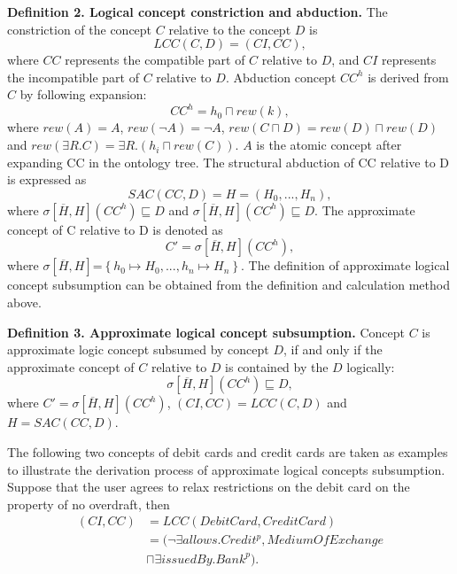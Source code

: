 \documentclass{ieeeaccess}
\begin{document}
\textbf{Definition 2. Logical concept constriction and abduction.}
The constriction of the concept $C$ relative to the concept $D$ is
\begin{equation}
LCC\left( C,D \right)=\left( CI,CC \right),
\end{equation}
where $CC$ represents the compatible part of $C$ relative to $D$, and $CI$ represents the incompatible part of $C$ relative to $D$.
Abduction concept $CC^{h}$ is derived from $C$ by following expansion:
\begin{equation}
CC^{h}={{h}_{0}}\sqcap rew\left( k \right),
\end{equation}
where $rew\left( A \right)=A$,
$rew\left( \neg A \right)=\neg A$,
$rew\left( C\sqcap D \right)=rew\left( D \right)\sqcap rew\left( D \right)$ and
$rew\left( \exists R.C \right)=\exists R.\left( {{h}_{i}}\sqcap rew\left( C \right) \right)$.
$A$ is the atomic concept after expanding CC in the ontology tree. The structural abduction of CC relative to D is expressed as
\begin{equation}
SAC\left( CC,D \right)=H=\left( {{H}_{0}},...,{{H}_{n}} \right),
\end{equation}
where $\sigma \left[ \overline{H},H \right]\left( C{{C}^{h}} \right)\sqsubseteq D$ and $\sigma \left[ \overline{H},H \right]\left( C{{C}^{h}} \right)\sqsubseteq D$.
The approximate concept of C relative to D is denoted as
\begin{equation}
C'=\sigma \left[ \overline{H},H \right]\left( C{{C}^{h}} \right),
\end{equation}
where $\sigma \left[ \overline{H},H \right]\text{=}\left\{ {{h}_{0}}\mapsto {{H}_{0}},...,{{h}_{n}}\mapsto {{H}_{n}} \right\}$.
The definition of approximate logical concept subsumption can be obtained from the definition and calculation method above.

\textbf{Definition 3. Approximate logical concept subsumption.} Concept $C$ is approximate logic concept subsumed by concept $D$, if and only if the approximate concept of $C$ relative to $D$ is contained by the $D$ logically:
\begin{equation}
\sigma \left[ \overline{H},H \right]\left( C{{C}^{h}} \right)\sqsubseteq D,
\end{equation}
where $C'=\sigma \left[ \overline{H},H \right]\left( C{{C}^{h}} \right)$, $\left( CI,CC \right)=LCC\left( C,D \right)$ and $H=SAC\left( CC,D \right)$.

The following two concepts of debit cards and credit cards are taken as examples to illustrate the derivation process of approximate logical concepts subsumption. Suppose that the user agrees to relax restrictions on the debit card on the property of no overdraft, then
\begin{align}
( CI,CC )&=LCC( DebitCard,CreditCard )\nonumber\\
& =( \neg \exists allows.Credi{{t}^{p}}, MediumOfExchange\nonumber\\
&\sqcap\exists issuedBy.Bank^{p} ).
\end{align}
\end{document}

